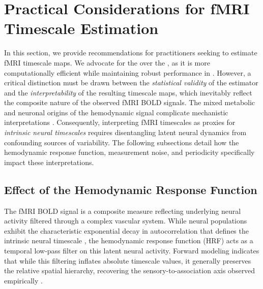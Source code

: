 \documentclass[docs/main.tex]{subfiles}
\begin{document}
\section{Practical Considerations for fMRI Timescale Estimation}\label{sec:practical-considerations}

In this section, we provide recommendations for practitioners seeking to estimate fMRI timescale maps. We advocate for the  over the , as it is more computationally efficient while maintaining robust performance in . However, a critical distinction must be drawn between the \textit{statistical validity} of the estimator and the \textit{interpretability} of the resulting timescale maps, which inevitably reflect the composite nature of the observed fMRI BOLD signals. The mixed metabolic and neuronal origins of the hemodynamic signal complicate mechanistic interpretations \citep{raut_hierarchical_2020, he_scale-free_2011}. Consequently, interpreting fMRI timescales as proxies for \textit{intrinsic neural timescales} requires disentangling latent neural dynamics from confounding sources of variability. The following subsections detail how the hemodynamic response function, measurement noise, and periodicity specifically impact these interpretations.

\subsection{Effect of the Hemodynamic Response Function}\label{sec:hrf}

The fMRI BOLD signal is a composite measure reflecting underlying neural activity filtered through a complex vascular system. While neural populations exhibit the characteristic exponential decay in autocorrelation that defines the intrinsic neural timescale \citep[Supplementary Mathematical Note]{murray_hierarchy_2014}, the hemodynamic response function (HRF) acts as a temporal low-pass filter on this latent neural activity. Forward modeling indicates that while this filtering inflates absolute timescale values, it generally preserves the relative spatial hierarchy, recovering the sensory-to-association axis observed empirically \citep{watanabe_atypical_2019}.\\
\end{document}
